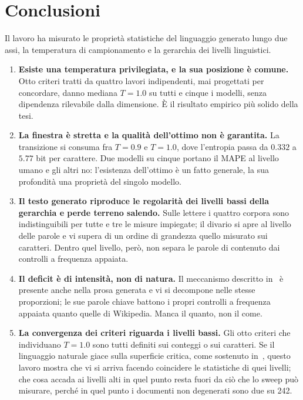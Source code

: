\section{Conclusioni}
\label{sec:conclusioni}

Il lavoro ha misurato le proprietà statistiche del linguaggio generato lungo
due assi, la temperatura di campionamento e la gerarchia dei livelli
linguistici.

\begin{enumerate}
  \item \textbf{Esiste una temperatura privilegiata, e la sua posizione è
    comune.} Otto criteri tratti da quattro lavori indipendenti, mai progettati
    per concordare, danno mediana $T = 1.0$ su tutti e cinque i modelli, senza
    dipendenza rilevabile dalla dimensione. È il risultato empirico più solido
    della tesi.

  \item \textbf{La finestra è stretta e la qualità dell'ottimo non è
    garantita.} La transizione si consuma fra $T = 0.9$ e $T = 1.0$, dove
    l'entropia passa da $0.332$ a $5.77$ bit per carattere. Due modelli su
    cinque portano il MAPE al livello umano e gli altri no: l'esistenza
    dell'ottimo è un fatto generale, la sua profondità una proprietà del
    singolo modello.

  \item \textbf{Il testo generato riproduce le regolarità dei livelli bassi
    della gerarchia e perde terreno salendo.} Sulle lettere i quattro corpora
    sono indistinguibili per tutte e tre le misure impiegate; il divario si apre
    al livello delle parole e vi supera di un ordine di grandezza quello
    misurato sui caratteri. Dentro quel livello, però, non separa le parole di
    contenuto dai controlli a frequenza appaiata.

  \item \textbf{Il deficit è di intensità, non di natura.} Il meccanismo
    descritto in~\cite{altmann2012} è presente anche nella prosa generata e vi
    si decompone nelle stesse proporzioni; le sue parole chiave battono i
    propri controlli a frequenza appaiata quanto quelle di Wikipedia. Manca il
    quanto, non il come.

  \item \textbf{La convergenza dei criteri riguarda i livelli bassi.} Gli otto
    criteri che individuano $T = 1.0$ sono tutti definiti sui conteggi o sui
    caratteri. Se il linguaggio naturale giace sulla superficie critica, come
    sostenuto in~\cite{nakaishi2024}, questo lavoro mostra che vi si arriva
    facendo coincidere le statistiche di quei livelli; che cosa accada ai
    livelli alti in quel punto resta fuori da ciò che lo sweep può misurare,
    perché in quel punto i documenti non degenerati sono due su \num{242}.
\end{enumerate}

